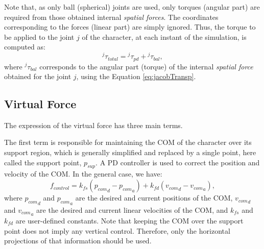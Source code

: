 \documentclass[tog]{acmsiggraph}
\begin{document}
Note that, as only ball (spherical) joints are used, only torques (angular part) are required from those obtained internal \textit{spatial forces}.
The coordinates corresponding to the forces (linear part) are simply ignored.
Thus, the torque to be applied to the joint $j$ of the character, at each instant of the simulation, is computed as:
%
\begin{equation}
  ^{j}\tau_{total} = {^{j}\tau_{pd}} + {^{j}\tau_{bal}},
\label{eq:pd_eq}
\end{equation}
%
where $^{j}\tau_{bal}$ corresponds to the angular part (torque) of the internal \textit{spatial force} obtained for the joint $j$,
using the Equation \ref{eq:jacobTransp}.


\subsection{Virtual Force}\label{forcavirtual}

The expression of the virtual force has three main terms.

The first term is responsible for maintaining the COM of the character over its support region, %
which is generally simplified and replaced by a single point, here called the support point, $p_{sup}$.
%
A PD controller is used to correct the position and velocity of the COM. In the general case, we have:
%
\begin{equation}
  f_{control} = k_{fs} \left( {p_{com}}_d - {p_{com}}_a \right) + k_{fd} \left( {v_{com}}_d - {v_{com}}_a \right),
  \label{eq:forcacontrole}
\end{equation}
%
where ${p_{com}}_d$ and ${p_{com}}_a$ are the desired and current positions of the COM, ${v_{com}}_d$ and ${v_{com}}_a$ are the desired and
current linear velocities of the COM, and $k_{fs}$ and $k_{fd}$ are user-defined constants.
%
Note that keeping the COM over the support point does not imply any vertical control. Therefore, only the horizontal projections of that information
should be used.
\end{document}
